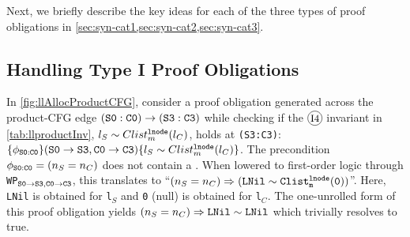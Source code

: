 Next, we briefly describe the key ideas for each of the three types of proof obligations in \cref{sec:syn-cat1,sec:syn-cat2,sec:syn-cat3}.

\subsection{Handling Type I Proof Obligations}
\label{sec:syn-cat1}
In \cref{fig:llAllocProductCFG}, consider a proof obligation generated
across the product-CFG edge ${\tt (S0:C0) \rightarrow (S3:C3)}$
while checking if the ${\small \circled{I4}}$ invariant in \cref{tab:llproductInv}, $l_{S}\sim{}Clist^{{\tt lnode}}_{m}(l_{C})$,
holds at {\tt (S3:C3)}:
$\{\phi_{{\tt S0:C0}}\} ({\tt S0\rightarrow S3}, {\tt C0\rightarrow C3}) \{l_{S}\sim{}Clist^{{\tt lnode}}_{m}(l_{C})\}$.
The precondition $\phi_{{\tt S0:C0}}=(n_S=n_C)$ does not contain
a \recursiveRelation{}.
When lowered to first-order logic through {\tt WP$_{{\tt S0\rightarrow S3},{\tt C0\rightarrow C3}}$}, this translates to
``$(n_S=n_C)\Rightarrow({\tt LNil}\sim{}{\tt Clist^{{\tt lnode}}_{m}(0)})$''.
Here, {\tt LNil} is obtained for {\tt l$_{S}$} and {\tt 0} (null) is
obtained for {\tt l$_C$}.
The one-unrolled form of this proof obligation yields
$(n_S=n_C)\Rightarrow{}{\tt LNil}\sim{}{\tt LNil}$ which trivially resolves to true.

